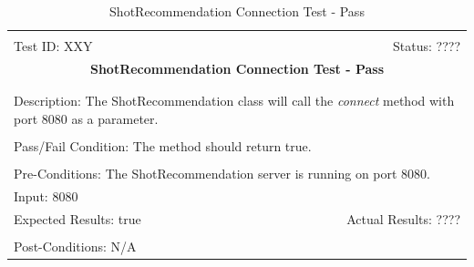 \documentclass[11pt]{article}
\begin{document}
\begin{center}
\begin{table}[H]
\begin{tabular}{|l r|}\hline&\\[-2mm]
	Test ID: XXY	&Status: ????\\[-3mm]
	\multicolumn{2}{|c|}{\textbf{\large{ShotRecommendation Connection Test - Pass}}}\\&\\\hline&\\[-3mm]
	\multicolumn{2}{|p{\textwidth}|}{Description: The ShotRecommendation class will call the \textit{connect} method with port 8080 as a parameter.}\\[1mm]\hline&\\[-3mm]
	\multicolumn{2}{|p{\textwidth}|}{Pass/Fail Condition: The method should return true.}\\[1mm]\hline&\\[-3mm]
	\multicolumn{2}{|p{\textwidth}|}{Pre-Conditions: The ShotRecommendation server is running on port 8080.}\\[4mm]
	\multicolumn{2}{|p{\textwidth}|}{Input: 8080}\\[2mm]\hline
	\multicolumn{1}{|p{0.49\textwidth}}{Expected Results: true}	&\multicolumn{1}{|p{0.45\textwidth}|}{Actual Results: ????}\\\hline&\\[-3mm]
	\multicolumn{2}{|p{\textwidth}|}{Post-Conditions: N/A}\\\hline
\end{tabular}
\caption{ShotRecommendation Connection Test - Pass}
\end{table}
\end{center}
\end{document}
